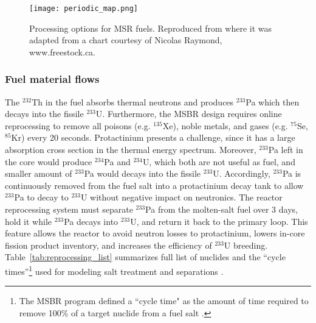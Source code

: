 \begin{figure}[htp!] %
  \texttt{[image: periodic\_map.png]}
  \caption{Processing options for \gls{MSR} fuels. 
          Reproduced from \cite{ahmad_neutronics_2015} where it was adapted 
          from a chart courtesy of Nicolas 
          Raymond, www.freestock.ca.}
  \label{fig:periodic_tab}
\end{figure}

\subsubsection{Fuel material flows}
The $^{232}$Th in the fuel absorbs thermal neutrons and produces $^{233}$Pa 
which then decays into the fissile $^{233}$U. Furthermore, the \gls{MSBR} 
design requires online reprocessing to remove all poisons (e.g. $^{135}$Xe), 
noble metals, and gases (e.g. $^{75}$Se, $^{85}$Kr) every 20 seconds. 
Protactinium presents a challenge, since it has a large absorption cross 
section in the thermal energy spectrum. Moreover, $^{233}$Pa left in the core
 would produce $^{234}$Pa and $^{234}$U, which both are not useful as fuel, 
and smaller amount of $^{233}$Pa would decays into the fissile $^{233}$U.
Accordingly, $^{233}$Pa is continuously 
removed from the fuel salt into a protactinium decay tank to allow $^{233}$Pa 
to decay to $^{233}$U without negative impact on neutronics. The reactor 
reprocessing system must separate $^{233}$Pa from the molten-salt fuel over 3 
days, hold it while $^{233}$Pa decays into $^{233}$U, and return it back to the 
primary loop. This feature allows the reactor to avoid neutron losses to 
protactinium, lowers in-core fission product inventory, and increases the 
efficiency of $^{233}$U breeding. Table~\ref{tab:reprocessing_list} summarizes 
full list of nuclides and the ``cycle times''\footnote{ The \gls{MSBR} program defined a ``cycle time" as the amount of time required to remove 100\% of a target nuclide from a fuel 
salt \cite{robertson_conceptual_1971}.} used for modeling salt treatment and 
separations \cite{robertson_conceptual_1971}. 

